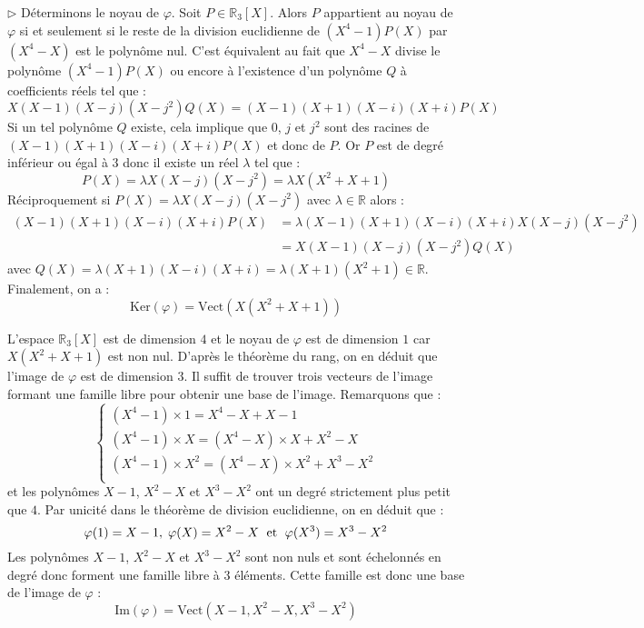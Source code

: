 \documentclass[a4paper,twoside,french,11pt]{VcCours}
\begin{document}
\noindent $\rhd$ Déterminons le noyau de $\varphi$. Soit $P \in \mathbb{R}_3[X]$. Alors $P$ appartient au noyau de $\varphi$ si et seulement si le reste de la division euclidienne de $(X^4-1)P(X)$ par $(X^4-X)$ est le polynôme nul. C'est équivalent au fait que $X^4-X$ divise le polynôme $(X^4-1)P(X)$ ou encore à l'existence d'un polynôme $Q$ à coefficients réels tel que :
$$ X(X-1)(X-j)(X-j^2) Q(X) = (X-1)(X+1)(X-i)(X+i) P(X)$$
Si un tel polynôme $Q$ existe, cela implique que $0$, $j$ et $j^2$ sont des racines de $(X-1)(X+1)(X-i)(X+i) P(X)$ et donc de $P$. Or $P$ est de degré inférieur ou égal à $3$ donc il existe un réel $\lambda$ tel que :
$$ P(X) = \lambda X (X-j)(X-j^2) = \lambda X (X^2+X+1)$$
Réciproquement si $P(X) = \lambda X (X-j)(X-j^2)$ avec $\lambda \in \mathbb{R}$ alors :
\begin{align*}
  (X-1)(X+1)(X-i)(X+i) P(X) 
  &= \lambda (X-1)(X+1)(X-i)(X+i) X (X-j)(X-j^2)\\
  &= X(X-1)(X-j)(X-j^2) Q(X)
\end{align*}
avec $Q(X) = \lambda (X+1)(X-i)(X+i) = \lambda(X+1)(X^2+1) \in \mathbb{R}$. Finalement, on a :
$$ \textrm{Ker}(\varphi) = \textrm{Vect}(X(X^2+X+1))$$



\noindent L'espace $\mathbb{R}_3[X]$ est de dimension $4$ et le noyau de $\varphi$ est de dimension $1$ car $X(X^2+X+1)$ est non nul. D'après le théorème du rang, on en déduit que l'image de $\varphi$ est de dimension $3$. Il suffit de trouver trois vecteurs de l'image formant une famille libre pour obtenir une base de l'image. Remarquons que :
$$ \left\lbrace \begin{array}{l}
(X^4-1) \times 1 = X^4-X + X-1 \\
(X^4-1) \times X = (X^4-X) \times X + X^2-X\\
(X^4-1) \times X^2 = (X^4-X) \times X^2 + X^3-X^2\\
\end{array}\right.$$
et les polynômes $X-1$, $X^2-X$ et $X^3-X^2$ ont un degré strictement plus petit que $4$. Par unicité dans le théorème de division euclidienne, on en déduit que :
$$ \varphi(1)= X-1, \; \varphi(X)= X^2-X \; \hbox{ et } \; \varphi(X^3) = X^3-X^2$$
Les polynômes $X-1$, $X^2-X$ et $X^3-X^2$ sont non nuls et sont échelonnés  en degré donc forment une famille libre à $3$ éléments. Cette famille est donc une base de l'image de $\varphi$ :
$$ \textrm{Im}(\varphi) = \textrm{Vect}(X-1,X^2-X,X^3-X^2)$$
\end{document}
